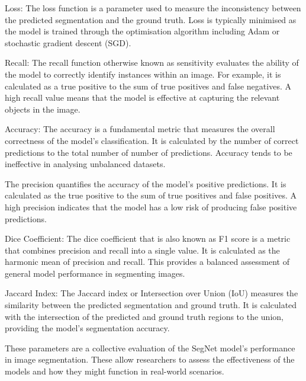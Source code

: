 \item Loss: The loss function is a parameter used to measure the inconsistency between the predicted segmentation and the ground truth. Loss is typically minimised as the model is trained through the optimisation algorithm including Adam or stochastic gradient descent (SGD).

\item Recall: The recall function otherwise known as sensitivity evaluates the ability of the model to correctly identify instances within an image. For example, it is calculated as a true positive to the sum of true positives and false negatives. A high recall value means that the model is effective at capturing the relevant objects in the image.

\item Accuracy: The accuracy is a fundamental metric that measures the overall correctness of the model's classification. It is calculated by the number of correct predictions to the total number of number of predictions. Accuracy tends to be ineffective in analysing unbalanced datasets.

\item The precision quantifies the accuracy of the model's positive predictions. It is calculated as the true positive to the sum of true positives and false positives. A high precision indicates that the model has a low risk of producing false positive predictions.

\item Dice Coefficient: The dice coefficient that is also known as F1 score is a metric that combines precision and recall into a single value. It is calculated as the harmonic mean of precision and recall. This provides a balanced assessment of general model performance in segmenting images.

\item Jaccard Index: The Jaccard index or Intersection over Union (IoU) measures the similarity between the predicted segmentation and ground truth. It is calculated with the intersection of the predicted and ground truth regions to the union, providing the model's segmentation accuracy.

These parameters are a collective evaluation of the SegNet model's performance in image segmentation. These allow researchers to assess the effectiveness of the models and how they might function in real-world scenarios.

